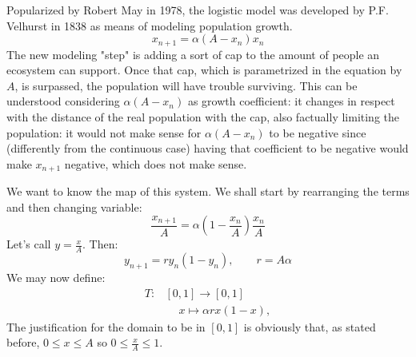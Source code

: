 \begin{example}
    Popularized by Robert May in 1978, the logistic model was developed by P.F. Velhurst in 1838 as means of modeling population growth.
    \begin{equation*}
        x_{n+1}=\alpha(A-x_n)x_n
    \end{equation*}
    The new modeling "step" is adding a sort of cap to the amount of people an ecosystem can support. Once that cap, which is parametrized in the equation by $A$, is surpassed, the population will have trouble surviving. This can be understood considering $\alpha(A-x_n)$ as growth coefficient: it changes in respect with the distance of the real population with the cap, also factually limiting the population: it would not make sense for $\alpha(A-x_n)$ to be negative since (differently from the continuous case) having that coefficient to be negative would make $x_{n+1}$ negative, which does not make sense. 
    
    We want to know the map of this system. We shall start by rearranging the terms and then changing variable:
    \begin{equation*}
        \frac{x_{n+1}}{A}=\alpha \left(1-\frac{x_n}{A}\right)\frac{x_n}{A}
    \end{equation*}
    Let's call $y=\frac{x}{A}$. Then:
    \begin{equation*}
        y_{n+1}=ry_n(1-y_n), \qquad r=A\alpha
    \end{equation*}
    We may now define:
    \begin{align*}
    T\colon&[0, 1]\longrightarrow[0, 1]\\
    &\phantom{+}x\mapsto \alpha rx(1-x),
     \end{align*}
    The justification for the domain to be in $[0, 1]$ is obviously that, as stated before, $0\leq x\leq A$ so $0\leq\frac{x}{A}\leq1$.
    \begin{figure}[ht]
        \centering
\end{figure}
\end{example}
